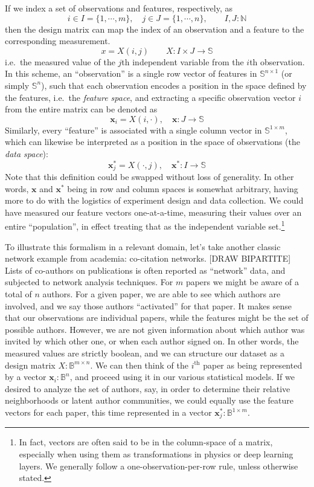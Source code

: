 \documentclass[%
	12pt,
		oneside,
		letterpaper
]{book}
\begin{document}
If we index a set of observations and features, respectively, as
\[ i\in I=\{1,\cdots,m\}, \quad j\in J=\{1,\cdots,n\},\qquad I,J:\mathbb{N}\]
then the design matrix can map the index of an observation and a feature
to the corresponding measurement.
\[x=X(i,j)\qquad X : I\times J \rightarrow \mathbb{S}\] i.e.~the
measured value of the \(j\)th independent variable from the \(i\)th
observation. In this scheme, an ``observation'' is a single row vector
of features in \(\mathbb{S}^{n\times 1}\) (or simply
\(\mathbb{S}^{n}\)), such that each observation encodes a position in
the space defined by the features, i.e.~the \emph{feature space}, and
extracting a specific observation vector \(i\) from the entire matrix
can be denoted as
\[\mathbf{x}_i=X(i,\cdot),\quad \mathbf{x}:J\rightarrow\mathbb{S}\]
Similarly, every ``feature'' is associated with a single column vector
in \(\mathbb{S}^{1\times m}\), which can likewise be interpreted as a
position in the space of observations (the \emph{data space}):
\[\mathbf{x}_j^*=X(\cdot,j),\quad \mathbf{x}^*:I\rightarrow\mathbb{S}\]
Note that this definition could be swapped without loss of generality.
In other words, \(\mathbf{x}\) and \(\mathbf{x}^*\) being in row and
column spaces is somewhat arbitrary, having more to do with the
logistics of experiment design and data collection. We could have
measured our feature vectors one-at-a-time, measuring their values over
an entire ``population'', in effect treating that as the independent
variable set.\footnote{ In fact, vectors are often said to be in the
  column-space of a matrix, especially when using them as
  transformations in physics or deep learning layers. We generally
  follow a one-observation-per-row rule, unless otherwise stated.}

To illustrate this formalism in a relevant domain, let's take another
classic network example from academia: co-citation networks. {[}DRAW
BIPARTITE{]} Lists of co-authors on publications is often reported as
``network'' data, and subjected to network analysis techniques. For
\(m\) papers we might be aware of a total of \(n\) authors. For a given
paper, we are able to see which authors are involved, and we say those
authors ``activated'' for that paper. It makes sense that our
observations are individual papers, while the features might be the set
of possible authors. However, we are not given information about which
author was invited by which other one, or when each author signed on. In
other words, the measured values are strictly boolean, and we can
structure our dataset as a design matrix \(X:\mathbb{B}^{m\times n}\).
We can then think of the \(i^{\mathrm{th}}\) paper as being represented
by a vector \(\mathbf{x}_i:\mathbb{B}^n\), and proceed using it in our
various statistical models. If we desired to analyze the set of authors,
say, in order to determine their relative neighborhoods or latent author
communities, we could equally use the feature vectors for each paper,
this time represented in a vector
\(\mathbf{x}^*_j:\mathbb{B}^{1\times m}\).
\end{document}
